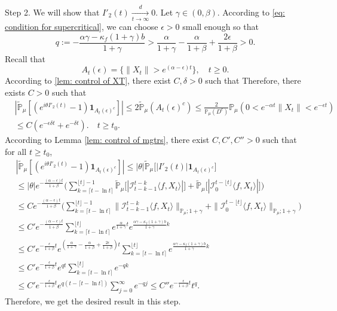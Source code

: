 \documentclass[12pt,a4paper]{amsart}
\theoremstyle{plain}
\theoremstyle{definition}
\numberwithin{equation}{section}
\begin{document}
	Step 2.
	We will show that $I'_2(t)\xrightarrow[t\to \infty]{d} 0$.
	Let $\gamma \in (0,\beta)$.
	According to \eqref{eq: condition for supercritical}, we can choose $\epsilon > 0$ small enough so that
\[
	q:= - \frac{\alpha \gamma-\kappa_f(1+\gamma)b}{1+\gamma}
	> \frac{\alpha}{1+\gamma}-\frac{\alpha}{1+\beta} + \frac{2\epsilon}{1+\beta} > 0.
\]
	Recall that
\[
	A_t(\epsilon)
	=\{\|X_t\|>e^{(\alpha-\epsilon )t}\},
	\quad t\geq 0.
\]
	According to \eqref{lem: control of XT}, there exist
	$C,\delta>0$ such that
	Therefore, there exists $C>0$ such that
\begin{equation}\begin{split}
    &|\mathbb{\tilde{P}}_{\mu}[(e^{i\theta I'_2(t)}-1)\mathbf{1}_{A_t(\epsilon)^c}]|
    \leq 2\mathbb{\tilde{P}}_{\mu}(A_t(\epsilon)^c)\leq \frac{2}{\mathbb{P}_{\mu}(D^c)}\mathbb{P}_{\mu}(0<e^{-\alpha t}\|X_t\|<e^{-\epsilon t})
    \\&\leq C(e^{-\epsilon\delta t}+e^{-\delta t}).
    \quad t\geq t_0.
\end{split}\end{equation}
	According to Lemma \ref{lem: control of mgtrs}, there exist $C,C',C''>0$ such that for all
	$t\ge t_0$,
\begin{align*}
    &|\mathbb{\tilde{P}}_{\mu} [ (e^{i\theta I'_2(t)}-1)\mathbf{1}_{A_t(\epsilon)^c}]|
    \leq |\theta| \mathbb{\tilde{P}}_{\mu} \big[ |I'_2(t)|\mathbf{1}_{A_t(\epsilon)^c}\big]
    \\&\leq|\theta| e^{-\frac{(\alpha - \epsilon )t}{1+\beta}} \Big(\sum_{k=\lceil t-\ln t \rceil}^{\lfloor t \rfloor - 1}\mathbb{\tilde{P}}_{\mu}\big[| \mathcal{I}_{t-k-1}^{t-k}\langle f,X_t\rangle|\big] + \mathbb{\tilde{P}}_{\mu}\big[| \mathcal{I}_{0}^{t-\lfloor t\rfloor}\langle f,X_t\rangle|\big]\Big)
    \\& \leq C  e^{-\frac{(\alpha - \epsilon )t}{1+\beta}} \Big(\sum_{k=\lceil t-\ln t \rceil}^{\lfloor t \rfloor - 1}\|\mathcal{I}_{t-k-1}^{t-k}\langle f,X_t\rangle\|_{\mathbb P_\mu; 1+\gamma} + \|\mathcal I_0^{t-\lfloor t \rfloor} \langle f, X_t\rangle\|_{\mathbb P_\mu;1+\gamma}\Big)
    \\ &\leq C'  e^{-\frac{(\alpha - \epsilon )t}{1+\beta}} \sum_{k=\lceil t-\ln t \rceil}^{\lfloor t \rfloor}e^{\frac{\alpha}{1+\gamma}t}e^{\frac{\alpha\gamma-\kappa_f(1+\gamma)b}{1+\gamma}k}\\
    &\leq C'  e^{-\frac{\epsilon}{1+\beta} t}e^{(\frac{\alpha }{1+\gamma}-\frac{\alpha }{1+\beta} + \frac{2\epsilon}{1+\beta})t} \sum_{k=\lceil t-\ln t \rceil}^{\lfloor t \rfloor}e^{\frac{\alpha\gamma-\kappa_f(1+\gamma)b}{1+\gamma}k}\\
    &\leq C'  e^{-\frac{\epsilon}{1+\beta} t} e^{qt} \sum_{k=\lceil t-\ln t \rceil}^{\lfloor t \rfloor}e^{-qk}\\
    &\leq C'  e^{-\frac{\epsilon}{1+\beta} t} e^{q(t - \lceil t - \ln t\rceil)} \sum_{j=0}^{\infty}e^{-qj}\leq C'' e^{-\frac{\epsilon}{1+\beta} t} t^q.
\end{align*}
	Therefore, we get the desired result in this step.
\end{document}
